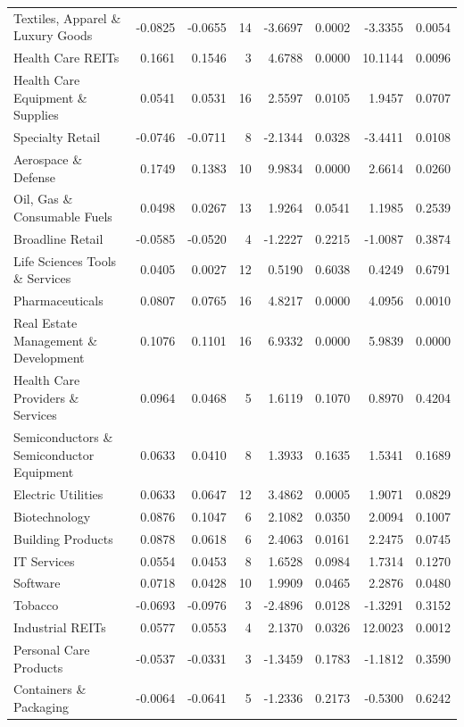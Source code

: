 \begin{table}
\begin{tabular}{lrrrrrrr}
Textiles, Apparel \& Luxury Goods & -0.0825 & -0.0655 & 14 & -3.6697 & 0.0002 & -3.3355 & 0.0054 \\
Health Care REITs & 0.1661 & 0.1546 & 3 & 4.6788 & 0.0000 & 10.1144 & 0.0096 \\
Health Care Equipment \& Supplies & 0.0541 & 0.0531 & 16 & 2.5597 & 0.0105 & 1.9457 & 0.0707 \\
Specialty Retail & -0.0746 & -0.0711 & 8 & -2.1344 & 0.0328 & -3.4411 & 0.0108 \\
Aerospace \& Defense & 0.1749 & 0.1383 & 10 & 9.9834 & 0.0000 & 2.6614 & 0.0260 \\
Oil, Gas \& Consumable Fuels & 0.0498 & 0.0267 & 13 & 1.9264 & 0.0541 & 1.1985 & 0.2539 \\
Broadline Retail & -0.0585 & -0.0520 & 4 & -1.2227 & 0.2215 & -1.0087 & 0.3874 \\
Life Sciences Tools \& Services & 0.0405 & 0.0027 & 12 & 0.5190 & 0.6038 & 0.4249 & 0.6791 \\
Pharmaceuticals & 0.0807 & 0.0765 & 16 & 4.8217 & 0.0000 & 4.0956 & 0.0010 \\
Real Estate Management \& Development & 0.1076 & 0.1101 & 16 & 6.9332 & 0.0000 & 5.9839 & 0.0000 \\
Health Care Providers \& Services & 0.0964 & 0.0468 & 5 & 1.6119 & 0.1070 & 0.8970 & 0.4204 \\
Semiconductors \& Semiconductor Equipment & 0.0633 & 0.0410 & 8 & 1.3933 & 0.1635 & 1.5341 & 0.1689 \\
Electric Utilities & 0.0633 & 0.0647 & 12 & 3.4862 & 0.0005 & 1.9071 & 0.0829 \\
Biotechnology & 0.0876 & 0.1047 & 6 & 2.1082 & 0.0350 & 2.0094 & 0.1007 \\
Building Products & 0.0878 & 0.0618 & 6 & 2.4063 & 0.0161 & 2.2475 & 0.0745 \\
IT Services & 0.0554 & 0.0453 & 8 & 1.6528 & 0.0984 & 1.7314 & 0.1270 \\
Software & 0.0718 & 0.0428 & 10 & 1.9909 & 0.0465 & 2.2876 & 0.0480 \\
Tobacco & -0.0693 & -0.0976 & 3 & -2.4896 & 0.0128 & -1.3291 & 0.3152 \\
Industrial REITs & 0.0577 & 0.0553 & 4 & 2.1370 & 0.0326 & 12.0023 & 0.0012 \\
Personal Care Products & -0.0537 & -0.0331 & 3 & -1.3459 & 0.1783 & -1.1812 & 0.3590 \\
Containers \& Packaging & -0.0064 & -0.0641 & 5 & -1.2336 & 0.2173 & -0.5300 & 0.6242 \\

\end{tabular}
\end{table}
